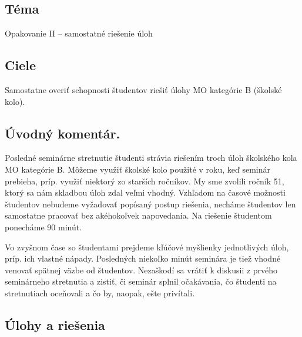 
\subsection*{Téma}
Opakovanie II -- samostatné riešenie úloh

\subsection*{Ciele}
Samostatne overiť schopnosti študentov riešiť úlohy MO kategórie B (školské kolo).

\subsection*{Úvodný komentár.} Posledné seminárne stretnutie študenti strávia riešením troch úloh školského kola MO kategórie B. Môžeme využiť školské kolo použité v roku, keď seminár prebieha, príp. využiť niektorý zo starších ročníkov. My sme zvolili ročník 51, ktorý sa nám skladbou úloh zdal veľmi vhodný. Vzhľadom na časové možnosti študentov nebudeme vyžadovať popísaný postup riešenia, necháme študentov len samostatne pracovať bez akéhokoľvek napovedania. Na riešenie študentom ponecháme 90 minút. 

Vo zvyšnom čase so študentami prejdeme kľúčové myšlienky jednotlivých úloh, príp. ich vlastné nápady. Posledných niekoľko minút seminára je tiež vhodné venovať spätnej väzbe od študentov. Nezaškodí sa vrátiť k diskusii z prvého seminárneho stretnutia a zistiť, či seminár splnil očakávania, čo študenti na stretnutiach oceňovali a čo by, naopak, ešte privítali.


\subsection*{Úlohy a riešenia}



